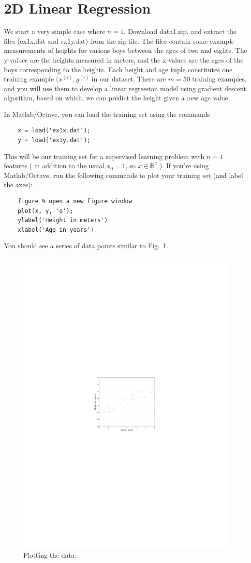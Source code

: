 \documentclass[10pt,a4paper]{article}
\begin{document}
\section{2D Linear Regression} \label{sec:2dlr}
%
  We start a very simple case where $n=1$. Download data1.zip, and extract the files (ex1x.dat and ex1y.dat) from the zip file. The files contain some example measurements of heights for various boys between the ages of two and eights. The y-values are the heights measured in meters, and the x-values are the ages of the boys corresponding to the heights. Each height and age tuple constitutes one training example  $(x^{(i)}, y^{(i)}$ in our dataset. There are $m = 50$ training examples, and you will use them to develop a linear regression model using gradient descent algorithm, based on which, we can predict the height given a new age value.

  In Matlab/Octave, you can load the training set using the commands
  \begin{lstlisting}
    x = load('ex1x.dat');
    y = load('ex1y.dat');
  \end{lstlisting}
  This will be our training set for a supervised learning problem with $n=1$ features ( in addition to the usual  $x_0 = 1$, so  $x \in {\mathbb R}^2$ ). If you're using Matlab/Octave, run the following commands to plot your training set (and label the axes):
  \begin{lstlisting}
    figure % open a new figure window
    plot(x, y, 'o');
    ylabel('Height in meters')
    xlabel('Age in years')
  \end{lstlisting}
  You should see a series of data points similar to Fig.~\ref{fig:data}.
  \begin{figure}[h!]
    \centering
      \includegraphics[width=.7\columnwidth]{datasample}
      \caption{Plotting the data.}
      \label{fig:data}
  \end{figure}
\end{document}
